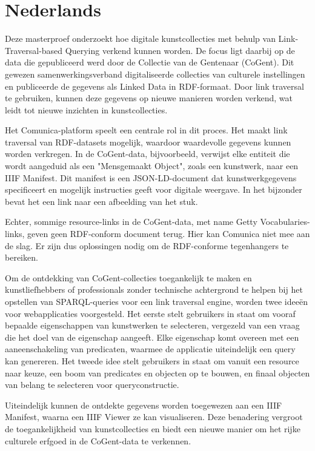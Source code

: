 \newpage
{}
\pagestyle{plainpage}

\section*{Nederlands}

Deze masterproef onderzoekt hoe digitale kunstcollecties met behulp van Link-Traversal-based Querying verkend kunnen worden. De focus ligt daarbij op de data die gepubliceerd werd door de Collectie van de Gentenaar (CoGent). Dit gewezen samenwerkingsverband digitaliseerde collecties van culturele instellingen en publiceerde de gegevens als Linked Data in RDF-formaat. Door link traversal te gebruiken, kunnen deze gegevens op nieuwe manieren worden verkend, wat leidt tot nieuwe inzichten in kunstcollecties.

Het Comunica-platform speelt een centrale rol in dit proces. Het maakt link traversal van RDF-datasets mogelijk, waardoor waardevolle gegevens kunnen worden verkregen. In de CoGent-data, bijvoorbeeld, verwijst elke entiteit die wordt aangeduid als een "Mensgemaakt Object", zoals een kunstwerk, naar een IIIF Manifest. Dit manifest is een JSON-LD-document dat kunstwerkgegevens specificeert en mogelijk instructies geeft voor digitale weergave. In het bijzonder bevat het een link naar een afbeelding van het stuk.

Echter, sommige resource-links in de CoGent-data, met name Getty Vocabularies-links, geven geen RDF-conform document terug. Hier kan Comunica niet mee aan de slag. Er zijn dus oplossingen nodig om de RDF-conforme tegenhangers te bereiken.

Om de ontdekking van CoGent-collecties toegankelijk te maken en kunstliefhebbers of professionals zonder technische achtergrond te helpen bij het opstellen van SPARQL-queries voor een link traversal engine, worden twee ideeën voor webapplicaties voorgesteld. Het eerste stelt gebruikers in staat om vooraf bepaalde eigenschappen van kunstwerken te selecteren, vergezeld van een vraag die het doel van de eigenschap aangeeft. Elke eigenschap komt overeen met een aaneenschakeling van predicaten, waarmee de applicatie uiteindelijk een query kan genereren. Het tweede idee stelt gebruikers in staat om vanuit een resource naar keuze, een boom van predicates en objecten op te bouwen, en finaal objecten van belang te selecteren voor queryconstructie.

Uiteindelijk kunnen de ontdekte gegevens worden toegewezen aan een IIIF Manifest, waarna een IIIF Viewer ze kan visualiseren. Deze benadering vergroot de toegankelijkheid van kunstcollecties en biedt een nieuwe manier om het rijke culturele erfgoed in de CoGent-data te verkennen.
